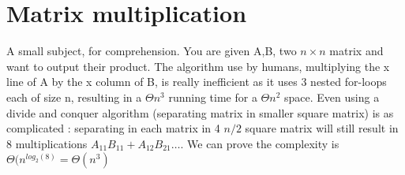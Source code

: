 \documentclass[12pt,twoside,a4paper]{article}
\begin{document}
\section{Matrix multiplication}
A small subject, for comprehension. You are given A,B, two $n\times n$ matrix and want to output their product. The algorithm use by humans, multiplying the x line of A by the x column of B, is really inefficient as it uses 3 nested for-loops each of size n, resulting in a $\Theta{n^3}$ running time for a $\Theta{n^2}$ space. Even using a divide and conquer algorithm (separating matrix in smaller square matrix) is as complicated : separating in each matrix in 4 $n/2$ square matrix will still result in 8 multiplications $A_{11}B_{11} + A_{12}B_{21}\ldots$. We can prove the complexity is $\Theta(n^{log_2(8)} = \Theta(n^3)$
\end{document}
